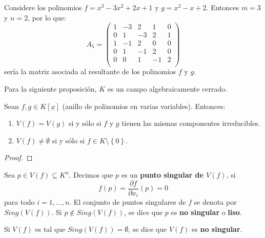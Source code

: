 \documentclass[12pt]{report}
\newcounter{it}
\theoremstyle{largebreak}
\begin{document}
    \begin{exa}
        Considere los polinomios $f=x^3-3x^2+2x+1$ y $g=x^2-x+2$. Entonces $m=3$ y $n=2$, por lo que:
        \begin{equation*}
            A_{5}=\left(
                \begin{array}{ccccc}
                    1 & -3 & 2 & 1 & 0 \\
                    0 & 1 & -3 & 2 & 1 \\
                    1 & -1 & 2 & 0 & 0 \\
                    0 & 1 & -1 & 2 & 0 \\
                    0 & 0 & 1 & -1 & 2 \\
                \end{array}
            \right)
        \end{equation*}
        sería la matriz asociada al resultante de los polinomios $f$ y $g$.
    \end{exa}

    Para la siguiente proposición, $K$ es un campo algebraicamente cerrado.

    \begin{propo}
        Sean $f,g\in K[\underline{x}]$ (anillo de polinomios en varias variables). Entonces:
        \begin{enumerate}
            \item $V(f)=V(g)$ si y sólo si $f$ y $g$ tienen las mismas componentes irreducibles.
            \item $V(f)\neq\emptyset$ si y sólo si $f\in K\setminus\left\{0\right\}$.
        \end{enumerate}
    \end{propo}

    \begin{proof}
        
    \end{proof}

    \begin{mydef}
        Sea $p\in V(f)\subseteq K^n$. Decimos que $p$ es un \textbf{punto singular de $V(f)$}, si
        \begin{equation*}
            f(p)=\frac{\partial f}{\partial x_i}(p)=0
        \end{equation*}
        para todo $i=1,...,n$. El conjunto de puntos singulares de $f$ se denota por $Sing(V(f))$. Si $p\notin Sing(V(f))$, se dice que $p$ es \textbf{no singular} o \textbf{liso}.

        Si $V(f)$ es tal que $Sing(V(f))=\emptyset$, se dice que $V(f)$ es \textbf{no singular}.
    \end{mydef}
\end{document}
